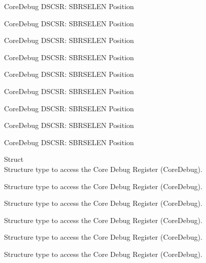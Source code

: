 \begin{DoxyRefList}
\label{deprecated__deprecated000650}%
%
Core\+Debug DSCSR\+: SBRSELEN Position 

\label{deprecated__deprecated000756}%
%
Core\+Debug DSCSR\+: SBRSELEN Position 

\label{deprecated__deprecated000810}%
%
Core\+Debug DSCSR\+: SBRSELEN Position 

\label{deprecated__deprecated000886}%
%
Core\+Debug DSCSR\+: SBRSELEN Position 

\label{deprecated__deprecated000949}%
%
Core\+Debug DSCSR\+: SBRSELEN Position 

\label{deprecated__deprecated001028}%
%
Core\+Debug DSCSR\+: SBRSELEN Position 

\label{deprecated__deprecated001104}%
%
Core\+Debug DSCSR\+: SBRSELEN Position 

\label{deprecated__deprecated001207}%
%
Core\+Debug DSCSR\+: SBRSELEN Position 

\label{deprecated__deprecated001309}%
%
Core\+Debug DSCSR\+: SBRSELEN Position  
\item[Struct \doxylink{struct_core_debug___type}{Core\+Debug\+\_\+\+Type} ]\hfill \\
\label{deprecated__deprecated000004}%
%
Structure type to access the Core Debug Register (Core\+Debug). 

\label{deprecated__deprecated000104}%
%
Structure type to access the Core Debug Register (Core\+Debug). 

\label{deprecated__deprecated000158}%
%
Structure type to access the Core Debug Register (Core\+Debug). 

\label{deprecated__deprecated000243}%
%
Structure type to access the Core Debug Register (Core\+Debug). 

\label{deprecated__deprecated000300}%
%
Structure type to access the Core Debug Register (Core\+Debug). 

\label{deprecated__deprecated000376}%
%
Structure type to access the Core Debug Register (Core\+Debug). 


\end{DoxyRefList}
